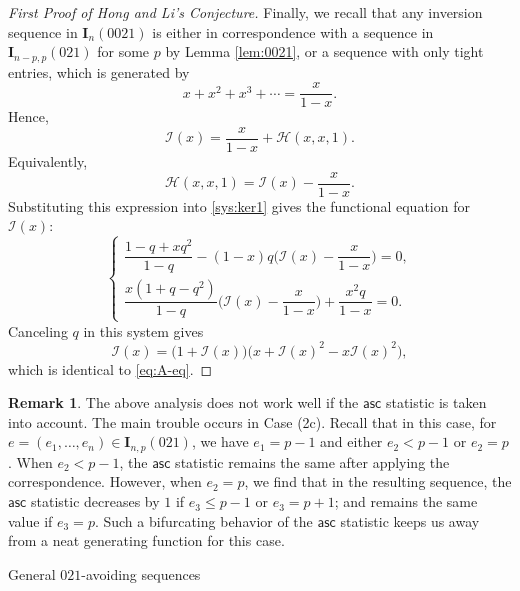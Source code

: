 \documentclass[reqno]{amsart}
\makeatletter
\numberwithin{equation}{section}
\theoremstyle{plain}
\theoremstyle{definition}
\newtheorem{remark}{Remark}[section]
\theoremstyle{named}
\def\section{\@startsection{section}{1}
  \z@{.7\linespacing\@plus\linespacing}{.5\linespacing}

  {\normalfont\scshape}}
\newcommand{\bI}{\mathbf{I}}
\newcommand{\asc}{\mathsf{asc}}
\newcommand{\cI}{\mathcal{I}}
\newcommand{\cH}{\mathcal{H}}
\makeatother
\begin{document}
\begin{proof}[First Proof of Hong and Li's Conjecture]
	Finally, we recall that any inversion sequence in $\bI_n(0021)$ is either in correspondence with a sequence in $\bI_{n-p,p}(021)$ for some $p$ by Lemma \ref{lem:0021}, or a sequence with only tight entries, which is generated by
	$$x+ x^2+ x^3+\cdots = \frac{x}{1-x}.$$
	Hence,
	$$
	\cI(x)=\frac{x}{1-x}+\cH(x,x,1).
	$$
	Equivalently, 
	$$
	\cH(x,x,1)=\cI(x)-\frac{x}{1-x}. 
	$$
	Substituting this expression into \eqref{sys:ker1} gives the functional equation for $\cI(x)$:
	\begin{equation*}
		\begin{cases}
			\dfrac{1-q+xq^2}{1-q}-(1-x)q\bigg(\cI(x)-\dfrac{x}{1-x}\bigg)=0,\\[12pt]
			\dfrac{x(1+q-q^2)}{1-q}\bigg(\cI(x)-\dfrac{x}{1-x}\bigg)+\dfrac{x^2q}{1-x}=0.
		\end{cases}
	\end{equation*}
	Canceling $q$ in this system gives
	$$\cI(x)=\big(1+\cI(x)\big)\big(x+\cI(x)^2-x\cI(x)^2\big),$$
	which is identical to \eqref{eq:A-eq}.
\end{proof}

\begin{remark}
	The above analysis does not work well if the $\asc$ statistic is taken into account. The main trouble occurs in Case (2c). Recall that in this case, for $e=(e_1,\ldots,e_n)\in\bI_{n,p}(021)$, we have $e_1=p-1$ and either $e_2<p-1$ or $e_2=p$. When $e_2<p-1$, the $\asc$ statistic remains the same after applying the correspondence. However, when $e_2=p$, we find that in the resulting sequence, the $\asc$ statistic decreases by $1$ if $e_3\le p-1$ or $e_3=p+1$; and remains the same value if $e_3=p$. Such a bifurcating behavior of the $\asc$ statistic keeps us away from a neat generating function for this case.
\end{remark}

\section{General \texorpdfstring{$021$}{}-avoiding sequences}
\end{document}
